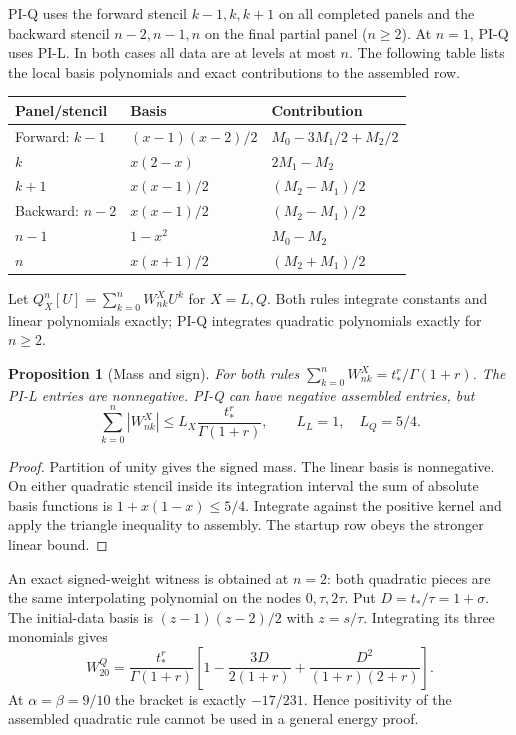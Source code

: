\documentclass[11pt,a4paper]{article}
\newtheorem{proposition}{Proposition}
\begin{document}
PI-Q uses the forward stencil $k-1,k,k+1$ on all completed panels and the backward stencil $n-2,n-1,n$ on the final partial panel ($n\ge2$). At $n=1$, PI-Q uses PI-L. In both cases all data are at levels at most $n$. The following table lists the local basis polynomials and exact contributions to the assembled row.
\begin{center}\small
\begin{tabular}{lll}
\toprule
Panel/stencil & Basis & Contribution\\\midrule
Forward: $k-1$ & $(x-1)(x-2)/2$ & $M_0-3M_1/2+M_2/2$\\
$k$ & $x(2-x)$ & $2M_1-M_2$\\
$k+1$ & $x(x-1)/2$ & $(M_2-M_1)/2$\\\midrule
Backward: $n-2$ & $x(x-1)/2$ & $(M_2-M_1)/2$\\
$n-1$ & $1-x^2$ & $M_0-M_2$\\
$n$ & $x(x+1)/2$ & $(M_2+M_1)/2$\\\bottomrule
\end{tabular}
\end{center}
Let $Q_X^n[U]=\sum_{k=0}^n W^X_{nk}U^k$ for $X=L,Q$. Both rules integrate constants and linear polynomials exactly; PI-Q integrates quadratic polynomials exactly for $n\ge2$.
\begin{proposition}[Mass and sign]
For both rules $\sum_{k=0}^nW^X_{nk}=t_*^r/\Gamma(1+r)$. The PI-L entries are nonnegative. PI-Q can have negative assembled entries, but
\[
 \sum_{k=0}^n|W^X_{nk}|\le L_X\frac{t_*^r}{\Gamma(1+r)},
 \qquad L_L=1,\quad L_Q=5/4.
\]
\end{proposition}
\begin{proof}
Partition of unity gives the signed mass. The linear basis is nonnegative. On either quadratic stencil inside its integration interval the sum of absolute basis functions is $1+x(1-x)\le5/4$. Integrate against the positive kernel and apply the triangle inequality to assembly. The startup row obeys the stronger linear bound.
\end{proof}
An exact signed-weight witness is obtained at $n=2$: both quadratic pieces are the same interpolating polynomial on the nodes $0,\tau,2\tau$. Put $D=t_*/\tau=1+\sigma$. The initial-data basis is $(z-1)(z-2)/2$ with $z=s/\tau$. Integrating its three monomials gives
\[
 W^Q_{20}=\frac{t_*^r}{\Gamma(1+r)}\left[1-\frac{3D}{2(1+r)}+\frac{D^2}{(1+r)(2+r)}\right].
\]
At $\alpha=\beta=9/10$ the bracket is exactly $-17/231$. Hence positivity of the assembled quadratic rule cannot be used in a general energy proof.
\end{document}
